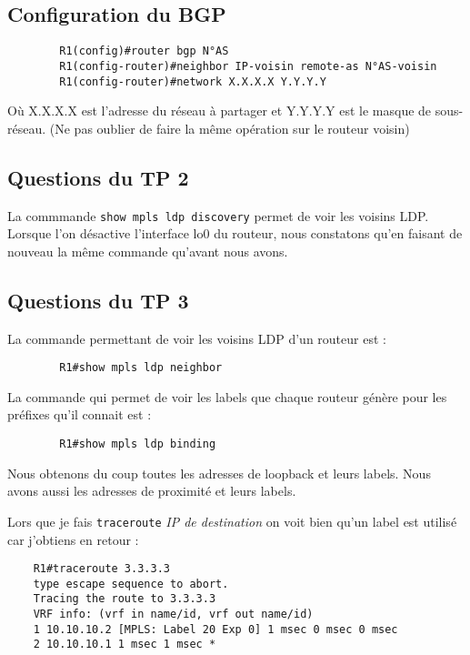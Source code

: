 \documentclass[12pt, a4paper]{article}
\begin{document}
\subsection{Configuration du BGP}
    \begin{verbatim}
        R1(config)#router bgp N°AS
        R1(config-router)#neighbor IP-voisin remote-as N°AS-voisin
        R1(config-router)#network X.X.X.X Y.Y.Y.Y 
    \end{verbatim}
Où X.X.X.X est l'adresse du réseau à partager et Y.Y.Y.Y est le masque de sous-réseau.
(Ne pas oublier de faire la même opération sur le routeur voisin)





\subsection{Questions du TP 2}
La commmande \texttt{show mpls ldp discovery} permet de voir les voisins LDP. 
Lorsque l'on désactive l'interface lo0 du routeur, nous constatons qu'en faisant
de nouveau la même commande qu'avant nous avons. 

\newpage

\subsection{Questions du TP 3}
La commande permettant de voir les voisins LDP d'un routeur est :
    \begin{verbatim}
        R1#show mpls ldp neighbor
    \end{verbatim}

La commande qui permet de voir les labels que chaque routeur génère pour 
les préfixes qu’il connait est : 
    \begin{verbatim}
        R1#show mpls ldp binding
    \end{verbatim}
Nous obtenons du coup toutes les adresses de loopback et leurs labels.
Nous avons aussi les adresses de proximité et leurs labels.



Lors que je fais \texttt{traceroute} \textit{IP de destination} on voit bien
qu'un label est utilisé car j'obtiens en retour : 
\begin{verbatim}
    R1#traceroute 3.3.3.3
    type escape sequence to abort.
    Tracing the route to 3.3.3.3
    VRF info: (vrf in name/id, vrf out name/id)
    1 10.10.10.2 [MPLS: Label 20 Exp 0] 1 msec 0 msec 0 msec
    2 10.10.10.1 1 msec 1 msec *
\end{verbatim}
\end{document}
